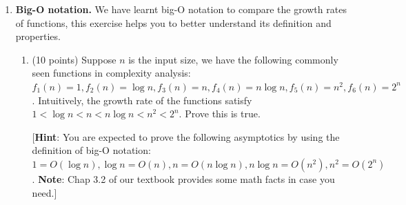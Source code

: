 \documentclass[12pt]{article}
\begin{document}
\begin{enumerate}

  \item \textbf{Big-O notation.} We have learnt big-O notation to compare the growth rates of functions, this exercise helps you to better understand its definition and properties.
  \begin{enumerate}
  	\item (10 points) Suppose $n$ is the input size, we have the following commonly seen functions in complexity analysis: $f_1(n)=1, f_2(n)=\log n, f_3(n)=n, f_4(n)=n\log n, f_5(n)=n^2, f_6(n)=2^n$. Intuitively, the growth rate of the functions satisfy $1<\log n<n<n\log n<n^2<2^n$. Prove this is true. 
	
	[\textbf{Hint}: You are expected to prove the following asymptotics by using the definition of big-O notation: $1=O(\log n), \log n=O(n), n=O(n\log n), n\log n=O(n^2), n^2=O(2^n)$. \textbf{Note}: Chap 3.2 of our textbook provides some math facts in case you need.]


\end{enumerate}
\end{enumerate}
\end{document}
